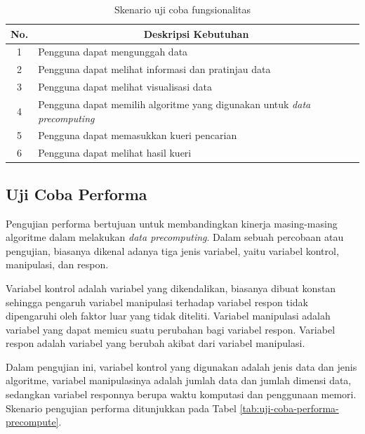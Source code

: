 \begin{table}[H]
	\centering
	\begin{tabular}{ | c | p{8cm} | }
		\hline
		\multicolumn{1}{|c}{\textbf{No.}} & \multicolumn{1}{|c|}{\textbf{Deskripsi Kebutuhan}} \\ \hline \hline
		1 & Pengguna dapat mengunggah data \\ \hline
		2 & Pengguna dapat melihat informasi dan pratinjau data \\ \hline
		3 & Pengguna dapat melihat visualisasi data  \\ \hline
		4 & Pengguna dapat memilih algoritme yang digunakan untuk \textit{data precomputing}\\ \hline
		5 & Pengguna dapat memasukkan kueri pencarian \\ \hline
		6 & Pengguna dapat melihat hasil kueri \\ \hline
	\end{tabular} \caption{Skenario uji coba fungsionalitas}
	\label{tab:uji-coba-fungsional}
\end{table}

\subsection{Uji Coba Performa}
\tab Pengujian performa bertujuan untuk membandingkan kinerja masing-masing algoritme dalam melakukan \textit{data precomputing}. Dalam sebuah percobaan atau pengujian, biasanya dikenal adanya tiga jenis variabel, yaitu variabel kontrol, manipulasi, dan respon. 

\pagebreak
Variabel kontrol adalah variabel yang dikendalikan, biasanya dibuat konstan sehingga pengaruh variabel manipulasi terhadap variabel respon tidak dipengaruhi oleh faktor luar yang tidak diteliti. Variabel manipulasi adalah variabel yang dapat memicu suatu perubahan bagi variabel respon. Variabel respon adalah variabel yang berubah akibat dari variabel manipulasi.

Dalam pengujian ini, variabel kontrol yang digunakan adalah jenis data dan jenis algoritme, variabel manipulasinya adalah jumlah data dan jumlah dimensi data, sedangkan variabel responnya berupa waktu komputasi dan penggunaan memori. Skenario pengujian performa ditunjukkan pada Tabel \ref{tab:uji-coba-performa-precompute}.

